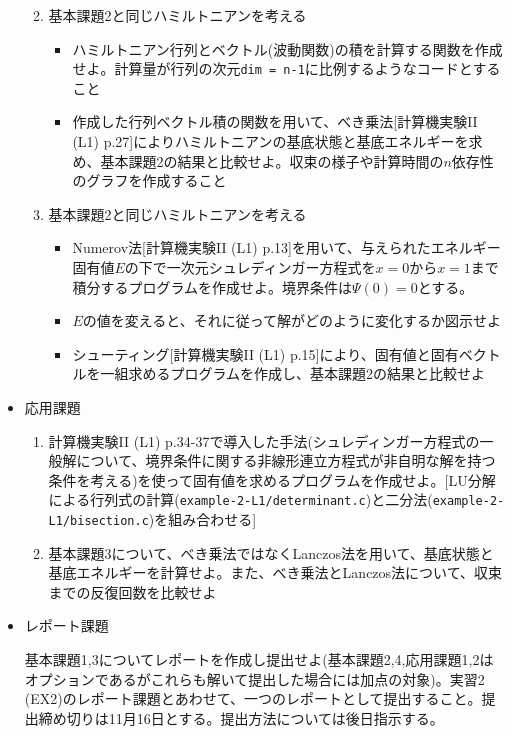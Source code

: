 \documentclass[11pt]{jarticle}
\begin{document}
\begin{itemize}
\begin{enumerate}
\begin{itemize}
    \end{itemize}
  \item 基本課題2と同じハミルトニアンを考える
    \begin{itemize}
      \item ハミルトニアン行列とベクトル(波動関数)の積を計算する関数を作成せよ。計算量が行列の次元{\tt dim = n-1}に比例するようなコードとすること
      \item 作成した行列ベクトル積の関数を用いて、べき乗法[計算機実験II (L1) p.27]によりハミルトニアンの基底状態と基底エネルギーを求め、基本課題2の結果と比較せよ。収束の様子や計算時間の$n$依存性のグラフを作成すること
    \end{itemize}
  \item 基本課題2と同じハミルトニアンを考える
     \begin{itemize}
     \item Numerov法[計算機実験II (L1) p.13]を用いて、与えられたエネルギー固有値$E$の下で一次元シュレディンガー方程式を$x=0$から$x=1$まで積分するプログラムを作成せよ。境界条件は$\Psi(0)=0$とする。%
     \item $E$の値を変えると、それに従って解がどのように変化するか図示せよ
     \item シューティング[計算機実験II (L1) p.15]により、固有値と固有ベクトルを一組求めるプログラムを作成し、基本課題2の結果と比較せよ
    \end{itemize}
  \end{enumerate}  
\item 応用課題
  \begin{enumerate}
  \item 計算機実験II (L1) p.34-37で導入した手法(シュレディンガー方程式の一般解について、境界条件に関する非線形連立方程式が非自明な解を持つ条件を考える)を使って固有値を求めるプログラムを作成せよ。[LU分解による行列式の計算({\tt example-2-L1/determinant.c})と二分法({\tt example-2-L1/bisection.c})を組み合わせる]
  \item 基本課題3について、べき乗法ではなくLanczos法を用いて、基底状態と基底エネルギーを計算せよ。また、べき乗法とLanczos法について、収束までの反復回数を比較せよ
  \end{enumerate}

\item レポート課題

  基本課題1,3についてレポートを作成し提出せよ(基本課題2,4,応用課題1,2はオプションであるがこれらも解いて提出した場合には加点の対象)。実習2 (EX2)のレポート課題とあわせて、一つのレポートとして提出すること。提出締め切りは11月16日とする。提出方法については後日指示する。

\end{itemize}
\end{document}
